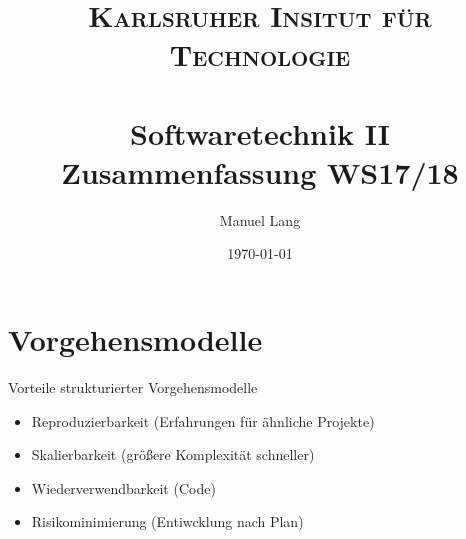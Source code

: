 \documentclass[paper=a4, fontsize=11pt]{scrartcl} %
\title{
\normalfont \normalsize
\textsc{Karlsruher Insitut für Technologie} \\ [25pt] %
\horrule{0.5pt} \\[0.4cm] %
\huge Softwaretechnik II\\ Zusammenfassung WS17/18 %
\horrule{2pt} \\[0.5cm] %
}
\author{Manuel Lang} %
\date{\normalsize\today} %
\numberwithin{equation}{section} %
\numberwithin{figure}{section} %
\numberwithin{table}{section} %
\begin{document}
\maketitle %

\section{Vorgehensmodelle}

Vorteile strukturierter Vorgehensmodelle
\begin{itemize}
  \item Reproduzierbarkeit (Erfahrungen für ähnliche Projekte)
  \item Skalierbarkeit (größere Komplexität schneller)
  \item Wiederverwendbarkeit (Code)
  \item Risikominimierung (Entiwcklung nach Plan)
\end{itemize}
\end{document}
